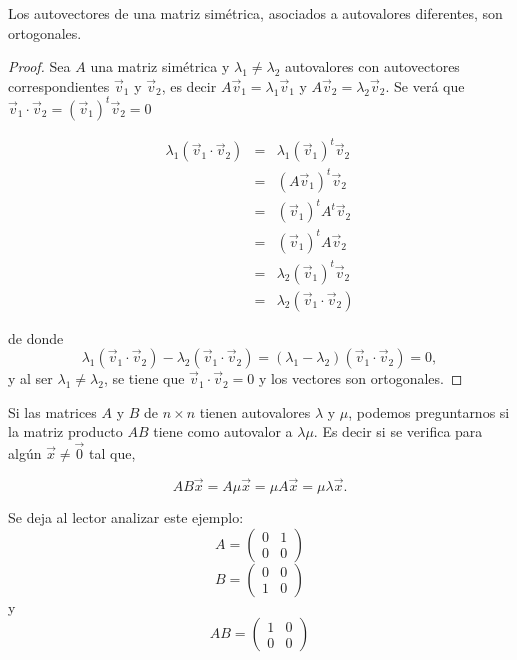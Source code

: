 \begin{corollary}
    \label{autoorto}
Los autovectores de una matriz simétrica, asociados a autovalores  diferentes, son ortogonales.
\begin{proof}
Sea $A$ una matriz simétrica y $\lambda_1\neq \lambda_2$ autovalores con autovectores correspondientes $\Vec{v}_1$ y $\Vec{v}_2$, es decir
$A \Vec{v}_1= \lambda_1 \Vec{v}_1$ y $A \Vec{v}_2= \lambda_2 \Vec{v}_2$. Se verá que  $\Vec{v}_1 \cdot \Vec{v}_2 = (\Vec{v}_1)^t \Vec{v}_2=0$


\begin{eqnarray*}
\lambda_1( \Vec{v}_1 \cdot \Vec{v}_2 )&=& \lambda_1 (\Vec{v}_1)^t  \Vec{v}_2   \\
&=& (A \Vec{v}_1)^t  \Vec{v}_2   \\
&=& (\Vec{v}_1)^t A^t \Vec{v}_2   \\
&=& (\Vec{v}_1)^t A \Vec{v}_2   \\
&=& \lambda_2  (\Vec{v}_1)^t \Vec{v}_2   \\
&=& \lambda_2 ( \Vec{v}_1 \cdot \Vec{v}_2 ) 
\end{eqnarray*}

\noindent
de donde
$$\lambda_1( \Vec{v}_1 \cdot \Vec{v}_2 )- \lambda_2 ( \Vec{v}_1 \cdot \Vec{v}_2 ) =( \lambda_1 - \lambda_2 )( \Vec{v}_1 \cdot \Vec{v}_2 )=  0,$$
\noindent
y al ser $\lambda_1\neq \lambda_2$, se tiene que  $\Vec{v}_1 \cdot \Vec{v}_2 =0$ y los vectores son ortogonales.
\end{proof}
\end{corollary}


\bigskip




\bigskip

\begin{example}

Si las matrices $A$ y $B$ de $ n \times n$ tienen autovalores $\lambda $ y $  \mu$, podemos preguntarnos si la matriz producto $AB$ tiene como autovalor a $\lambda   \mu$. Es decir si se verifica  para algún $\Vec{x}  \neq \Vec{0}$ tal que, 


$$AB\Vec{x}= A \mu \Vec{x}= \mu A \Vec{x}= \mu \lambda \Vec{x}.$$


Se deja al lector analizar  este ejemplo:
$$A=\left(\begin{array}{cc}  0 & 1  \\ 0 &  0
\end{array}
\right)$$
$$B=\left(\begin{array}{cc}  0 & 0  \\ 1 &  0
\end{array}
\right)$$
y $$AB=\left(\begin{array}{cc}  1 & 0  \\ 0 &  0
\end{array}
\right)$$
\end{example}

